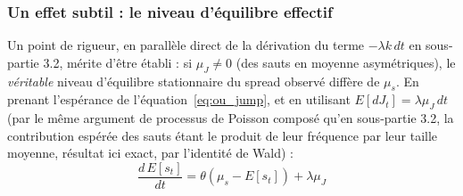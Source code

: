 \documentclass{article}
\begin{document}
\subsubsection*{Un effet subtil : le niveau d'équilibre effectif}
Un point de rigueur, en parallèle direct de la dérivation du terme $-\lambda k\,dt$ en sous-partie 3.2, mérite d'être établi : si $\mu_J \neq 0$ (des sauts en moyenne asymétriques), le \emph{véritable} niveau d'équilibre stationnaire du spread observé diffère de $\mu_s$.
En prenant l'espérance de l'équation~\eqref{eq:ou_jump}, et en utilisant $E[dJ_t] = \lambda\mu_J\,dt$ (par le même argument de processus de Poisson composé qu'en sous-partie 3.2, la contribution espérée des sauts étant le produit de leur fréquence par leur taille moyenne, résultat ici exact, par l'identité de Wald) :
\begin{equation}
\frac{d\,E[s_t]}{dt} = \theta\left(\mu_s - E[s_t]\right) + \lambda\mu_J
\end{equation}
\end{document}
